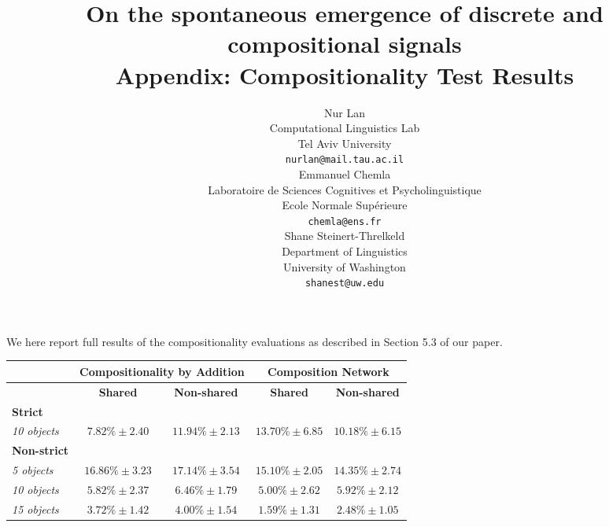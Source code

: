 \documentclass[11pt,a4paper]{article}
\title{On the spontaneous emergence of discrete and compositional signals \\
Appendix: Compositionality Test Results}
\author{Nur Lan \\
  Computational Linguistics Lab \\
  Tel Aviv University \\
  \texttt{nurlan@mail.tau.ac.il} \\\And
  Emmanuel Chemla \\
  Laboratoire de Sciences Cognitives et Psycholinguistique \\
  Ecole Normale Sup\'erieure \\
  \texttt{chemla@ens.fr} \\\And
  Shane Steinert-Threlkeld \\
  Department of Linguistics \\
  University of Washington \\
  \texttt{shanest@uw.edu}
  }
\date{}
\DeclareMathOperator*{\argmax}{arg\,max}
\DeclareMathOperator*{\argmin}{arg\,min}
\begin{document}
\maketitle





We here report full results of the compositionality evaluations as described in Section 5.3 of our paper.

\newcommand{\MESS}[1]{\textsc{m}(#1)}

\begin{table*}[h!]
\begin{tabular}{lcccc}
\toprule
                       & \multicolumn{2}{c}{\textbf{Compositionality by Addition}} & \multicolumn{2}{c}{\textbf{Composition Network}} \\ \midrule
                       & \textbf{Shared} & \textbf{Non-shared} & \textbf{Shared} & \textbf{Non-shared} \\ \midrule
\textbf{Strict} & \\ 
\emph{10 objects} &  $7.82\%\pm 2.40$  & $11.94\%\pm 2.13$ &  $13.70\%\pm 6.85$  & $10.18\%\pm 6.15$      \\ %
\textbf{Non-strict} & \\
\emph{5 objects} &
	$16.86\%\pm 3.23$  & $17.14\%\pm 3.54$ &  $15.10\%\pm 2.05$  & $14.35\%\pm 2.74$      \\
\emph{10 objects} &
	$5.82\%\pm 2.37$  & $6.46\%\pm 1.79$ &  $5.00\%\pm 2.62$  & $5.92\%\pm 2.12$     \\
\emph{15 objects} &
	$3.72\%\pm 1.42$  & $4.00\%\pm 1.54$ &  $1.59\%\pm 1.31$  & $2.48\%\pm 1.05$     \\ \bottomrule
\end{tabular}
\caption{Communicative success using messages `inferred' by assuming a systemic relation within $\argmin_i$/$\argmax_i$ message pairs. The `compositionality by addition` method assumes that \MESS{$c, \argmax_i$} = \MESS{$c, \argmax_j$} - \MESS{$c, \argmin_j$} + \MESS{$c, \argmin_i$}. The `compositional network' is an MLP trained to predict \MESS{$c, \argmax_i$} from the other three messages. Displayed values are object recovery accuracies averaged for all $i$. }\label{tab:composition_accuracy}
\end{table*}
\end{document}
